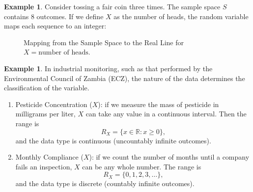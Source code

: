 \documentclass[12pt,a4paper]{report}
\theoremstyle{definition}
\newtheorem{example}[thm]{Example}
\theoremstyle{plain}
\theoremstyle{definition}
\begin{document}
\begin{example}
Consider tossing a fair coin three times. The sample space $S$ contains 8 outcomes. If we define $X$ as the number of heads, the random variable maps each sequence to an integer:
 
\begin{figure}[H]\centering{}\caption{Mapping from the Sample Space to the Real Line for $X = \text{number of heads}$.}
\end{figure}
\end{example}



\begin{example}
In industrial monitoring, such as that performed by the Environmental Council of Zambia (ECZ), the nature of the data determines the classification of the variable.
\begin{enumerate}
\item Pesticide Concentration ($X$): if we measure the mass of pesticide in milligrams per liter, $X$ can take any value in a continuous interval. Then the range is  \[R_X = \{x \in \mathbb{R} : x \geq 0\},\] and the data type is  continuous (uncountably infinite outcomes).
\item Monthly Compliance ($X$): if we count the number of months until a company fails an inspection, $X$ can be any whole number. The range is \[R_X = \{0, 1, 2, 3, \dots\},\] and the data type is  discrete (countably infinite outcomes).
\end{enumerate}
\end{example}
\end{document}
